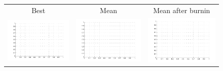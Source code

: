 \documentclass{article}
\begin{document}
\begin{figure}
\begin{tabular}{ccc}
Best & Mean & Mean after burnin\\
\includegraphics[scale=0.25]{emptiness.pdf}
&

\includegraphics[scale=0.25]{emptiness.pdf}

&

\includegraphics[scale=0.25]{emptiness.pdf}
\end{tabular}
\end{figure}
\end{document}
